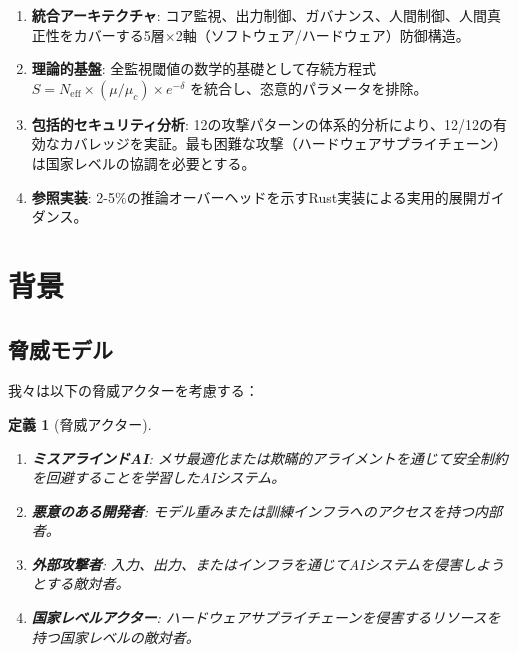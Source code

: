 \documentclass[11pt,a4paper]{article}
\newtheorem{definition}{定義}
\newcommand{\Neff}{N_{\text{eff}}}
\newcommand{\muc}{\mu_c}
\begin{document}
\begin{enumerate}
    \item \textbf{統合アーキテクチャ}: コア監視、出力制御、ガバナンス、人間制御、人間真正性をカバーする5層×2軸（ソフトウェア/ハードウェア）防御構造。

    \item \textbf{理論的基盤}: 全監視閾値の数学的基礎として存続方程式 $S = \Neff \times (\mu/\muc) \times e^{-\delta}$ を統合し、恣意的パラメータを排除。

    \item \textbf{包括的セキュリティ分析}: 12の攻撃パターンの体系的分析により、12/12の有効なカバレッジを実証。最も困難な攻撃（ハードウェアサプライチェーン）は国家レベルの協調を必要とする。

    \item \textbf{参照実装}: 2-5\%の推論オーバーヘッドを示すRust実装による実用的展開ガイダンス。
\end{enumerate}

\section{背景}
\label{sec:background}

\subsection{脅威モデル}

我々は以下の脅威アクターを考慮する：

\begin{definition}[脅威アクター]
\label{def:threat_actors}
\begin{enumerate}
    \item[(a)] \textbf{ミスアラインドAI}: メサ最適化または欺瞞的アライメントを通じて安全制約を回避することを学習したAIシステム。
    \item[(b)] \textbf{悪意のある開発者}: モデル重みまたは訓練インフラへのアクセスを持つ内部者。
    \item[(c)] \textbf{外部攻撃者}: 入力、出力、またはインフラを通じてAIシステムを侵害しようとする敵対者。
    \item[(d)] \textbf{国家レベルアクター}: ハードウェアサプライチェーンを侵害するリソースを持つ国家レベルの敵対者。
\end{enumerate}
\end{definition}
\end{document}
